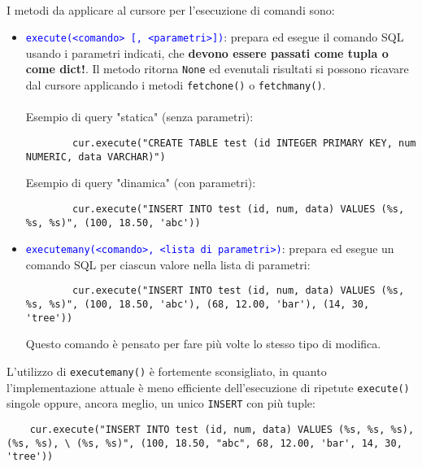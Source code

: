 \documentclass[12pt,a4paper]{book}
\begin{document}
	\paragraph{}I metodi da applicare al cursore per l'esecuzione di comandi sono:
	\begin{itemize}
		\item \textcolor{blue}{\texttt{execute(<comando> [, <parametri>])}}: prepara ed esegue il comando SQL usando i parametri indicati, che \textbf{devono essere passati come tupla o come dict!}. Il metodo ritorna \texttt{None} ed evenutali risultati si possono ricavare dal cursore applicando i metodi \texttt{fetchone()} o \texttt{fetchmany()}.\\ \\
		Esempio di query "statica" (senza parametri):
		\begin{lstlisting}
		cur.execute("CREATE TABLE test (id INTEGER PRIMARY KEY, num NUMERIC, data VARCHAR)")
		\end{lstlisting}
		Esempio di query "dinamica" (con parametri):
		\begin{lstlisting}
		cur.execute("INSERT INTO test (id, num, data) VALUES (%s, %s, %s)", (100, 18.50, 'abc'))
		\end{lstlisting}
		\item \textcolor{blue}{\texttt{executemany(<comando>, <lista di parametri>)}}: prepara ed esegue un comando SQL per ciascun valore nella lista di parametri:
		\begin{lstlisting}
		cur.execute("INSERT INTO test (id, num, data) VALUES (%s, %s, %s)", (100, 18.50, 'abc'), (68, 12.00, 'bar'), (14, 30, 'tree'))
		\end{lstlisting}
		Questo comando è pensato per fare più volte lo stesso tipo di modifica.
	\end{itemize}
	\begin{tcolorbox}[enhanced jigsaw, breakable, title=Attenzione, colframe=red!70!black]
	L'utilizzo di \texttt{executemany()} è fortemente sconsigliato, in quanto l'implementazione attuale è meno efficiente dell'esecuzione di ripetute \texttt{execute()} singole oppure, ancora meglio, un unico \texttt{INSERT} con più tuple:
	\begin{lstlisting}
	cur.execute("INSERT INTO test (id, num, data) VALUES (%s, %s, %s), (%s, %s), \ (%s, %s)", (100, 18.50, "abc", 68, 12.00, 'bar', 14, 30, 'tree'))
	\end{lstlisting}
	\end{tcolorbox}
\end{document}
